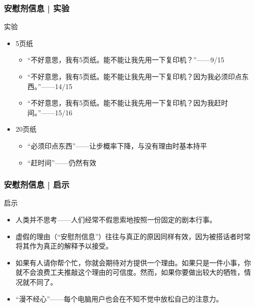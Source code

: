 \begin{frame}
  \frametitle{安慰剂信息 | 实验}
  \begin{block}{实验}
    \begin{itemize}
      \item 5页纸
    \begin{itemize}
      \item “不好意思，我有5页纸。能不能让我先用一下复印机？”——9/15
      \item “不好意思，我有5页纸。能不能让我先用一下复印机？因为我必须印点东西。”——14/15
      \item “不好意思，我有5页纸。能不能让我先用一下复印机？因为我赶时间。”——15/16
    \end{itemize}
      \item 20页纸
        \begin{itemize}
          \item “必须印点东西”——让步概率下降，与没有理由时基本持平
          \item “赶时间”——仍然有效
        \end{itemize}
    \end{itemize}
  \end{block}
\end{frame}

\begin{frame}
  \frametitle{安慰剂信息 | 启示}
  \begin{block}{启示}
    \begin{itemize}
      \item 人类并不思考——人们经常不假思索地按照一份固定的剧本行事。
      \item 虚假的理由（“安慰剂信息”）往往与真正的原因同样有效，因为被搭话者时常将其作为真正的解释予以接受。
      \item 如果有人请你帮个忙，你就会期待对方提供一个理由。如果只是一件小事，你就不会浪费工夫推敲这个理由的可信度。然而，如果你要做出较大的牺牲，情况就不同了。
      \item “漫不经心”——每个电脑用户也会在不知不觉中放松自己的注意力。
    \end{itemize}
  \end{block}
\end{frame}

